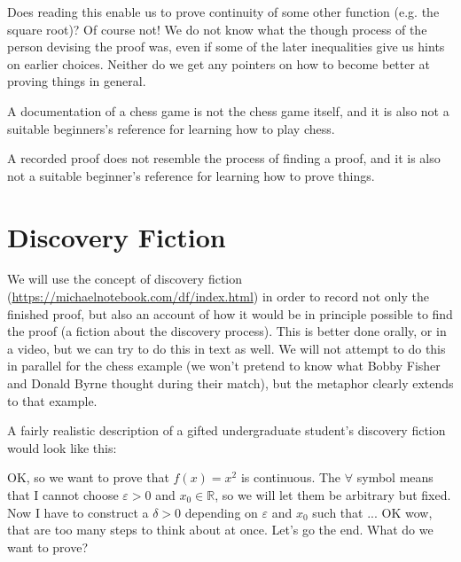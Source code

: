 \documentclass[11pt]{article}
\theoremstyle{plain}
\theoremstyle{definition}
\theoremstyle{remark}
\numberwithin{equation}{section}
\newcommand{\R}{\mathbb{R}}
\newcommand{\eps}{\varepsilon}
\begin{document}
\begin{paracol}{2}
\begin{nthcolumn*}{0}
\end{nthcolumn*}
    \begin{nthcolumn}{1}
    Does reading this enable us to prove continuity of some other function (e.g. the square root)? Of course not! We do not know what the though process of the person devising the proof was, even if some of the later inequalities give us hints on earlier choices. Neither do we get any pointers on how to become better at proving things in general. 
    \end{nthcolumn}  
\begin{nthcolumn*}{0}
A documentation of a chess game is not the chess game itself, and it is also not a suitable beginners's reference for learning how to play chess.
\end{nthcolumn*}
    \begin{nthcolumn}{1}
    A recorded proof does not resemble the process of finding a proof, and it is also not a suitable beginner's reference for learning how to prove things.
    \end{nthcolumn}  
\end{paracol}

\section{Discovery Fiction}
We will use the concept of discovery fiction (\href{https://michaelnotebook.com/df/index.html}{https://michaelnotebook.com/df/index.html}) in order to record not only the finished proof, but also an account of how it would be in principle possible to find the proof (a fiction about the discovery process). This is better done orally, or in a video, but we can try to do this in text as well. We will not attempt to do this in parallel for the chess example (we won't pretend to know what Bobby Fisher and Donald Byrne thought during their match), but the metaphor clearly extends to that example.

A fairly realistic description of a gifted undergraduate student's discovery fiction would look like this:

OK, so we want to prove that $f(x) = x^2$ is continuous. The $\forall$ symbol means that I cannot choose $\eps>0$ and $x_0\in \R$, so we will let them be arbitrary but fixed. Now I have to construct a $\delta > 0$ depending on $\eps$ and $x_0$ such that ... OK wow, that are too many steps to think about at once. Let's go the end. What do we want to prove?
\end{document}
